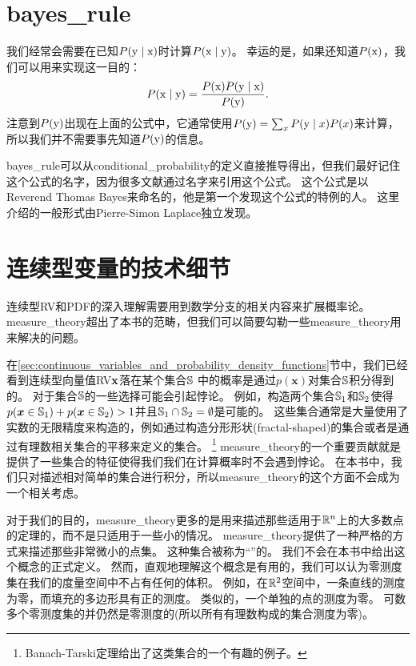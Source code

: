 \section{\gls{bayes_rule}}
\label{sec:bayes_rule}

我们经常会需要在已知$P(\mathrm{y} \mid \mathrm{x})$时计算$P(\mathrm{x} \mid \mathrm{y})$。
幸运的是，如果还知道$P(\mathrm{x})$，我们可以用来实现这一目的：
\begin{equation}
P(\mathrm{x} \mid \mathrm{y}) = \frac{P(\mathrm{x}) P(\mathrm{y} \mid \mathrm{x})}{P(\mathrm{y})}.
\end{equation}
注意到$P(\mathrm{y})$出现在上面的公式中，它通常使用$P(\mathrm{y}) = \sum_x P(\mathrm{y} \mid x) P(x)$来计算，所以我们并不需要事先知道$P(\mathrm{y})$的信息。

\gls{bayes_rule}可以从\gls{conditional_probability}的定义直接推导得出，但我们最好记住这个公式的名字，因为很多文献通过名字来引用这个公式。
这个公式是以Reverend Thomas Bayes来命名的，他是第一个发现这个公式的特例的人。
这里介绍的一般形式由Pierre-Simon Laplace独立发现。

\section{连续型变量的技术细节}
\label{sec:technical_details_of_continuous_variables}

连续型\gls{RV}和\gls{PDF}的深入理解需要用到数学分支的相关内容来扩展概率论。
\gls{measure_theory}超出了本书的范畴，但我们可以简要勾勒一些\gls{measure_theory}用来解决的问题。

在\ref{sec:continuous_variables_and_probability_density_functions}节中，我们已经看到连续型向量值\gls{RV}$\mathbf{x}$落在某个集合$\mathbb{S}$ 中的概率是通过$p(\bm{x})$对集合$\mathbb{S}$积分得到的。
对于集合$\mathbb{S}$的一些选择可能会引起悖论。
例如，构造两个集合$\mathbb{S}_1$和$\mathbb{S}_2$使得$p(\bm{x}\in \mathbb{S}_1) + p(\bm{x}\in \mathbb{S}_2)>1$并且$\mathbb{S}_1 \cap \mathbb{S}_2 = \emptyset$是可能的。
这些集合通常是大量使用了实数的无限精度来构造的，例如通过构造分形形状(fractal-shaped)的集合或者是通过有理数相关集合的平移来定义的集合。
\footnote{Banach-Tarski定理给出了这类集合的一个有趣的例子。}
\gls{measure_theory}的一个重要贡献就是提供了一些集合的特征使得我们我们在计算概率时不会遇到悖论。
在本书中，我们只对描述相对简单的集合进行积分，所以\gls{measure_theory}的这个方面不会成为一个相关考虑。


对于我们的目的，\gls{measure_theory}更多的是用来描述那些适用于$\mathbb{R}^n$上的大多数点的定理的，而不是只适用于一些小的情况。
\gls{measure_theory}提供了一种严格的方式来描述那些非常微小的点集。
这种集合被称为``''的。
我们不会在本书中给出这个概念的正式定义。
然而，直观地理解这个概念是有用的，我们可以认为零测度集在我们的度量空间中不占有任何的体积。
例如，在$\mathbb{R}^2$空间中，一条直线的测度为零，而填充的多边形具有正的测度。
类似的，一个单独的点的测度为零。
可数多个零测度集的并仍然是零测度的(所以所有有理数构成的集合测度为零)。

